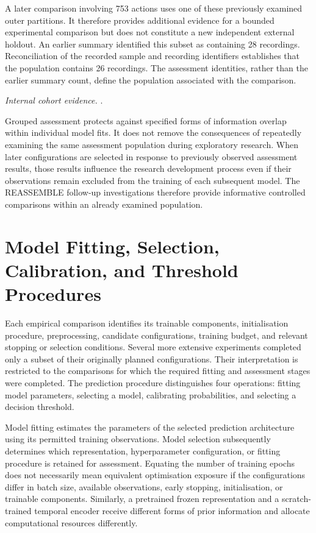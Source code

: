 A later comparison involving 753 actions uses one of these previously examined outer partitions. It therefore provides additional evidence for a bounded experimental comparison but does not constitute a new independent external holdout. An earlier summary identified this subset as containing 28 recordings. Reconciliation of the recorded sample and recording identifiers establishes that the population contains 26 recordings. The assessment identities, rather than the earlier summary count, define the population associated with the comparison.

\noindent\textit{Internal cohort evidence.} .

Grouped assessment protects against specified forms of information overlap within individual model fits. It does not remove the consequences of repeatedly examining the same assessment population during exploratory research. When later configurations are selected in response to previously observed assessment results, those results influence the research development process even if their observations remain excluded from the training of each subsequent model. The REASSEMBLE follow-up investigations therefore provide informative controlled comparisons within an already examined population.

\section{Model Fitting, Selection, Calibration, and Threshold Procedures}
\label{sec:ch4-fitting}

Each empirical comparison identifies its trainable components, initialisation procedure, preprocessing, candidate configurations, training budget, and relevant stopping or selection conditions. Several more extensive experiments completed only a subset of their originally planned configurations. Their interpretation is restricted to the comparisons for which the required fitting and assessment stages were completed. The prediction procedure distinguishes four operations: fitting model parameters, selecting a model, calibrating probabilities, and selecting a decision threshold.

Model fitting estimates the parameters of the selected prediction architecture using its permitted training observations. Model selection subsequently determines which representation, hyperparameter configuration, or fitting procedure is retained for assessment. Equating the number of training epochs does not necessarily mean equivalent optimisation exposure if the configurations differ in batch size, available observations, early stopping, initialisation, or trainable components. Similarly, a pretrained frozen representation and a scratch-trained temporal encoder receive different forms of prior information and allocate computational resources differently.

